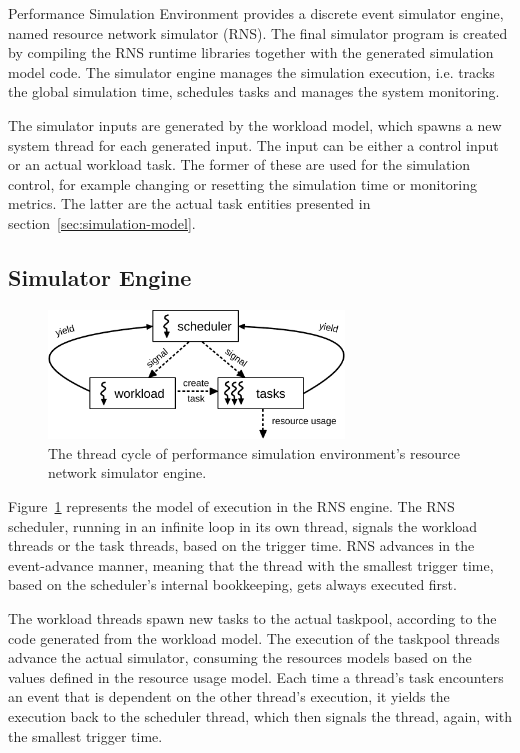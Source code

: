 Performance Simulation Environment provides a discrete event simulator engine, named resource network simulator (RNS). The final simulator program is created by compiling the RNS runtime libraries together with the generated simulation model code. The simulator engine manages the simulation execution, i.e. tracks the global simulation time, schedules tasks and manages the system monitoring.

The simulator inputs are generated by the workload model, which spawns a new system thread for each generated input. The input can be either a control input or an actual workload task. The former of these are used for the simulation control, for example changing or resetting the simulation time or monitoring metrics. The latter are the actual task entities presented in section~\ref{sec:simulation-model}.

\subsection{Simulator Engine}
\label{sec:simulator-engine}

\begin{figure}[]
  \begin{center}
    \includegraphics[width=0.7\textwidth]{images/rns-threads.pdf}
    \caption{The thread cycle of performance simulation environment's resource network simulator engine.}
    \label{fig:rns-threads}
  \end{center}
\end{figure}

Figure~\ref{fig:rns-threads} represents the model of execution in the RNS engine. The RNS scheduler, running in an infinite loop in its own thread, signals the workload threads or the task threads, based on the trigger time. RNS advances in the event-advance manner, meaning that the thread with the smallest trigger time, based on the scheduler's internal bookkeeping, gets always executed first.

The workload threads spawn new tasks to the actual taskpool, according to the code generated from the workload model. The execution of the taskpool threads advance the actual simulator, consuming the resources models based on the values defined in the resource usage model. Each time a thread's task encounters an event that is dependent on the other thread's execution, it yields the execution back to the scheduler thread, which then signals the thread, again, with the smallest trigger time.



